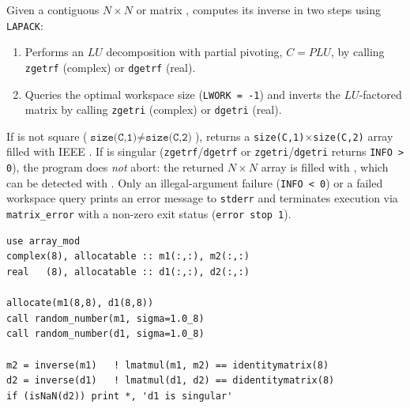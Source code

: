 Given a contiguous $N\times N$  or  matrix ,  computes its inverse  in two steps using \texttt{LAPACK}:
\begin{enumerate}
  \item Performs an $LU$ decomposition with partial pivoting, $C = P L U$, by calling \texttt{zgetrf} (complex) or \texttt{dgetrf} (real).
  \item Queries the optimal workspace size (\texttt{LWORK = -1}) and inverts the $LU$-factored matrix by calling \texttt{zgetri} (complex) or \texttt{dgetri} (real).
\end{enumerate}
If  is not square ($\texttt{size(C,1)} \neq \texttt{size(C,2)}$),  returns a \texttt{size(C,1)}$\times$\texttt{size(C,2)} array filled with IEEE . If  is singular (\texttt{zgetrf}/\texttt{dgetrf} or \texttt{zgetri}/\texttt{dgetri} returns \texttt{INFO > 0}), the program does \emph{not} abort: the returned $N\times N$ array is filled with , which can be detected with . Only an illegal-argument failure (\texttt{INFO < 0}) or a failed workspace query prints an error message to \texttt{stderr} and terminates execution via \texttt{matrix\_error} with a non-zero exit status (\texttt{error stop 1}).

\begin{description}[leftmargin=2.2cm, style=nextline]
\end{description}

\lstset{language=[95]Fortran}
\begin{lstlisting}
use array_mod
complex(8), allocatable :: m1(:,:), m2(:,:)
real   (8), allocatable :: d1(:,:), d2(:,:)

allocate(m1(8,8), d1(8,8))
call random_number(m1, sigma=1.0_8)
call random_number(d1, sigma=1.0_8)

m2 = inverse(m1)   ! lmatmul(m1, m2) == identitymatrix(8)
d2 = inverse(d1)   ! lmatmul(d1, d2) == didentitymatrix(8)
if (isNaN(d2)) print *, 'd1 is singular'
\end{lstlisting}

